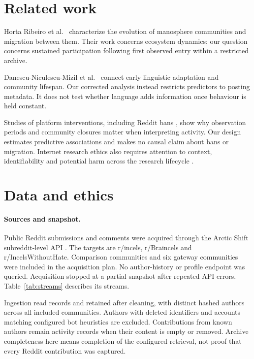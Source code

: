 \documentclass[10pt,twocolumn]{article}
\begin{document}
\section{Related work}
Horta Ribeiro et al.\ \cite{ribeiro2021} characterize the evolution of manosphere communities and migration between them. Their work concerns ecosystem dynamics; our question concerns sustained participation following first observed entry within a restricted archive.

Danescu-Niculescu-Mizil et al.\ \cite{danescu2013} connect early linguistic adaptation and community lifespan. Our corrected analysis instead restricts predictors to posting metadata. It does not test whether language adds information once behaviour is held constant.

Studies of platform interventions, including Reddit bans \cite{chandrasekharan2017}, show why observation periods and community closures matter when interpreting activity. Our design estimates predictive associations and makes no causal claim about bans or migration. Internet research ethics also requires attention to context, identifiability and potential harm across the research lifecycle \cite{aoir2020}.

\section{Data and ethics}\label{sec:ethics}
\paragraph{Sources and snapshot.} Public Reddit submissions and comments were acquired through the Arctic Shift subreddit-level API \cite{arcticshift}. The targets are r/incels, r/Braincels and r/IncelsWithoutHate. Comparison communities and six gateway communities were included in the acquisition plan. No author-history or profile endpoint was queried. Acquisition stopped at a partial snapshot after repeated API errors. Table~\ref{tab:streams} describes its streams.

Ingestion read \NRead{} records and retained \NKept{} after cleaning, with \NAuthorsAll{} distinct hashed authors across all included communities. Authors with deleted identifiers and accounts matching configured bot heuristics are excluded. Contributions from known authors remain activity records when their content is empty or removed. Archive completeness here means completion of the configured retrieval, not proof that every Reddit contribution was captured.
\end{document}
